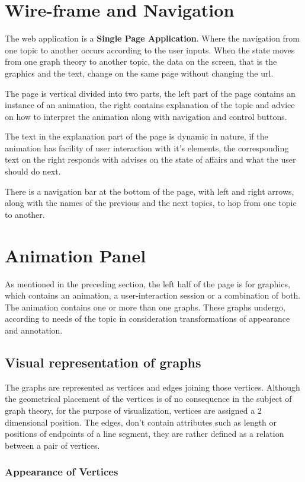 \section{Wire-frame and Navigation}
The web application is a \textbf{Single Page Application}. Where the navigation
from one topic to another occurs according to the user inputs. When the state
moves from one graph theory to another topic, the data on the screen, that is
the graphics and the text, change on the same page without changing the url.

The page is vertical divided into two parts, the left part of the page contains
an instance of an animation, the right contains explanation of the topic and
advice on how to interpret the animation along with navigation and control
buttons. 

The text in the explanation part of the page is dynamic in nature, if the
animation has facility of user interaction with it's elements, the
corresponding text on the right responds with advises on the state of affairs
and what the user should do next.

There is a navigation bar at the bottom of the page, with left and right
arrows, along with the names of the previous and the next topics, to hop from
one topic to another.


\section{Animation Panel} 
As mentioned in the preceding section, the left half of the page is for
graphics, which contains an animation, a user-interaction session or a
combination of both.  The animation contains one or more than one graphs. These
graphs undergo, according to needs of the topic in consideration
transformations of appearance and annotation.

\subsection{Visual representation of graphs} 
The graphs are represented as vertices and edges joining those vertices.
Although the geometrical placement of the vertices is of no consequence in the
subject of graph theory, for the purpose of visualization, vertices are
assigned a 2 dimensional position. The edges, don't contain attributes such as
length or positions of endpoints of a line segment, they are rather defined as
a relation between a pair of vertices.

\subsubsection{Appearance of Vertices} 

